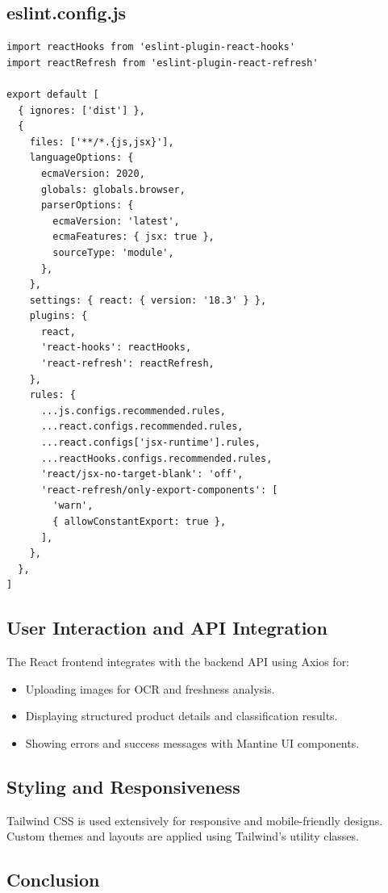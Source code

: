 \documentclass[12pt]{report}
\begin{document}
\subsection*{eslint.config.js}
\begin{verbatim}
import reactHooks from 'eslint-plugin-react-hooks'
import reactRefresh from 'eslint-plugin-react-refresh'

export default [
  { ignores: ['dist'] },
  {
    files: ['**/*.{js,jsx}'],
    languageOptions: {
      ecmaVersion: 2020,
      globals: globals.browser,
      parserOptions: {
        ecmaVersion: 'latest',
        ecmaFeatures: { jsx: true },
        sourceType: 'module',
      },
    },
    settings: { react: { version: '18.3' } },
    plugins: {
      react,
      'react-hooks': reactHooks,
      'react-refresh': reactRefresh,
    },
    rules: {
      ...js.configs.recommended.rules,
      ...react.configs.recommended.rules,
      ...react.configs['jsx-runtime'].rules,
      ...reactHooks.configs.recommended.rules,
      'react/jsx-no-target-blank': 'off',
      'react-refresh/only-export-components': [
        'warn',
        { allowConstantExport: true },
      ],
    },
  },
]
\end{verbatim}

\subsection{User Interaction and API Integration}

The React frontend integrates with the backend API using Axios for:

\begin{itemize}
    \item Uploading images for OCR and freshness analysis.
    \item Displaying structured product details and classification results.
    \item Showing errors and success messages with Mantine UI components.
\end{itemize}

\subsection{Styling and Responsiveness}

Tailwind CSS is used extensively for responsive and mobile-friendly designs. Custom themes and layouts are applied using Tailwind’s utility classes.

\subsection{Conclusion}
\end{document}
